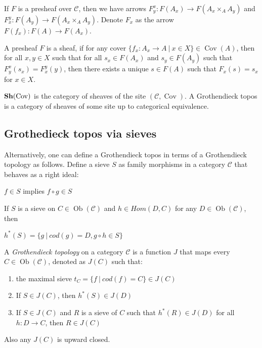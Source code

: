 \documentclass[a4paper]{article}
\theoremstyle{defin}
\theoremstyle{theorem}
\theoremstyle{claim}
\theoremstyle{prop}
\theoremstyle{lemma}
\theoremstyle{fact}
\theoremstyle{ex}
\theoremstyle{col}
\begin{document}

If $F$ is a presheaf over $\mathcal{C}$, then we have arrows $F^x_y : F(A_x) \to F(A_x \times_A A_y)$ and $F^y_x : F(A_y) \to F(A_x \times_A A_y)$. Denote $F_x$ as the arrow $F(f_x) : F(A) \to F(A_x)$.



A presheaf $F$ is a sheaf, if for any cover $\{ f_x : A_x \to A \: | \: x \in X \} \in \operatorname{Cov}(A)$, then for all $x, y \in X$ such that for all $s_x \in F(A_x)$ and $s_y \in F(A_y)$ such that $F^x_y(s_x) = F^y_x(y)$, then there exists a unique $s \in F(A)$ such that $F_x(s) = s_x$ for $x \in X$.

${\bf Sh}(\operatorname{Cov})$ is the category of sheaves of the site $(\mathcal{C}, \operatorname{Cov})$. A Grothendieck topos is a category of sheaves of some site up to categorical equivalence.

\subsection{Grothedieck topos via sieves}

Alternatively, one can define a Grothendieck topos in terms of a Grothendieck topology as follows. Define a sieve $S$
as family morphisms in a category $\mathcal{C}$ that behaves as a right ideal:

\begin{center}
$f \in S$ implies $f \circ g \in S$
\end{center}

If $S$ is a sieve on $C \in \operatorname{Ob}(\mathcal{C})$ and $h \in Hom(D, C)$ for any $D \in \operatorname{Ob}(\mathcal{C})$, then
\begin{center}
$h^*(S) = \{ g \: | \: cod(g) = D, g \circ h \in S \}$
\end{center}

A \emph{Grothendieck topology} on a category $\mathcal{C}$ is a function $J$ that maps every $C \in \operatorname{Ob}(\mathcal{C})$, denoted as $J(C)$ such that:
\begin{enumerate}
\item the maximal sieve $t_C = \{ f \: | \: cod(f) = C\} \in J(C)$
\item If $S \in J(C)$, then $h^*(S) \in J(D)$
\item If $S \in J(C)$ and $R$ is a sieve of $C$ such that $h^*(R) \in J(D)$ for all $h : D \to C$, then $R \in J(C)$
\end{enumerate}
Also any $J(C)$ is upward closed.
\end{document}
